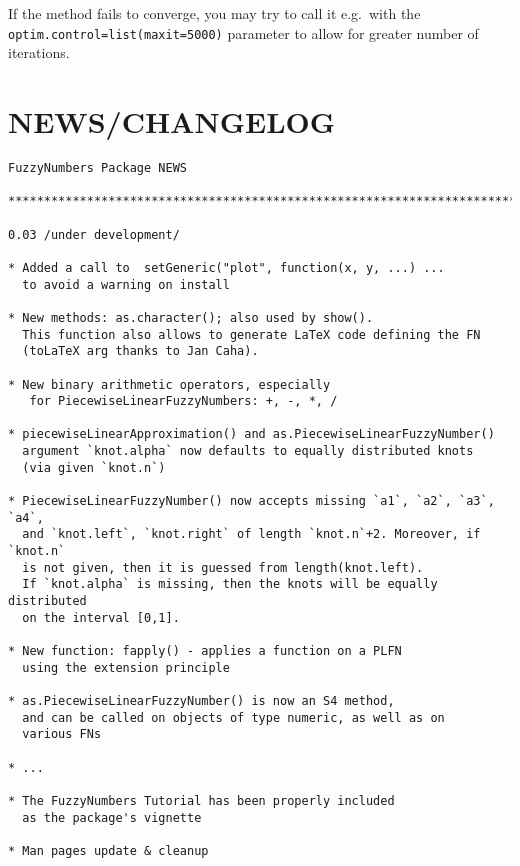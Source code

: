 \documentclass[11pt]{article}\usepackage{graphicx, color}
\makeatletter
\newenvironment{kframe}{%
 \def\at@end@of@kframe{}%
 \ifinner\ifhmode%
  \def\at@end@of@kframe{\end{minipage}}%
  \begin{minipage}{\columnwidth}%
 \fi\fi%
 \def\FrameCommand##1{\hskip\@totalleftmargin \hskip-\fboxsep
 \colorbox{shadecolor}{##1}\hskip-\fboxsep
     \hskip-\linewidth \hskip-\@totalleftmargin \hskip\columnwidth}%
 \MakeFramed {\advance\hsize-\width
   \@totalleftmargin\z@ \linewidth\hsize
   \@setminipage}}%
 {\par\unskip\endMakeFramed%
 \at@end@of@kframe}
\newenvironment{knitrout}{}{} %
\makeatother
\begin{document}
If the method fails to converge, you may try to call it
e.g.~with the \texttt{optim.control=list(maxit=\allowbreak{}5000)} parameter
to allow for greater number of iterations.









\section{NEWS/CHANGELOG}

\begin{knitrout}\small
{}\color{fgcolor}\begin{kframe}
\begin{verbatim}
FuzzyNumbers Package NEWS

***************************************************************************

0.03 /under development/

* Added a call to  setGeneric("plot", function(x, y, ...) ...
  to avoid a warning on install

* New methods: as.character(); also used by show().
  This function also allows to generate LaTeX code defining the FN
  (toLaTeX arg thanks to Jan Caha).

* New binary arithmetic operators, especially
   for PiecewiseLinearFuzzyNumbers: +, -, *, /

* piecewiseLinearApproximation() and as.PiecewiseLinearFuzzyNumber()
  argument `knot.alpha` now defaults to equally distributed knots
  (via given `knot.n`)

* PiecewiseLinearFuzzyNumber() now accepts missing `a1`, `a2`, `a3`, `a4`,
  and `knot.left`, `knot.right` of length `knot.n`+2. Moreover, if `knot.n`
  is not given, then it is guessed from length(knot.left).
  If `knot.alpha` is missing, then the knots will be equally distributed
  on the interval [0,1].

* New function: fapply() - applies a function on a PLFN
  using the extension principle

* as.PiecewiseLinearFuzzyNumber() is now an S4 method,
  and can be called on objects of type numeric, as well as on
  various FNs

* ...

* The FuzzyNumbers Tutorial has been properly included
  as the package's vignette

* Man pages update & cleanup


\end{verbatim}
\end{kframe}
\end{knitrout}
\end{document}
